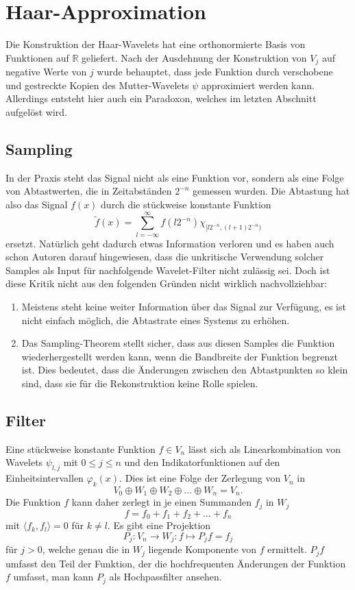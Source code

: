 %
%
%
\section{Haar-Approximation
\label{haar:approximation}}
Die Konstruktion der Haar-Wavelets hat eine orthonormierte Basis von
Funktionen auf $\mathbb R$ geliefert.
Nach der Ausdehnung der Konstruktion von $V_j$ auf negative Werte von $j$
wurde behauptet, dass jede Funktion durch verschobene und gestreckte 
Kopien des Mutter-Wavelets $\psi$ approximiert werden kann.
Allerdings entsteht hier auch ein Paradoxon, welches im letzten Abschnitt
aufgelöst wird.

\subsection{Sampling}
In der Praxis steht das Signal nicht als eine Funktion vor, sondern
als eine Folge von Abtastwerten, die in Zeitabständen $2^{-n}$ 
gemessen wurden.
Die Abtastung hat also das Signal $f(x)$ durch die stückweise
konstante Funktion
\[
\tilde{f}(x)
=
\sum_{l=-\infty}^\infty f(l2^{-n}) \chi_{[l2^{-n},(l+1)2^{-n})}
\]
ersetzt.
Natürlich geht dadurch etwas Information verloren und es haben auch
schon Autoren darauf hingewiesen, dass die unkritische Verwendung solcher
Samples als Input für nachfolgende Wavelet-Filter nicht zulässig sei.
Doch ist diese Kritik nicht aus den folgenden Gründen nicht wirklich
nachvollziehbar:
\begin{enumerate}
\item
Meistens steht keine weiter Information über das Signal zur Verfügung,
es ist nicht einfach möglich, die Abtastrate eines Systems zu erhöhen.
\item
Das Sampling-Theorem stellt sicher, dass aus diesen Samples die Funktion
wiederhergestellt werden kann, wenn die Bandbreite der Funktion 
begrenzt ist.
Dies bedeutet, dass die Änderungen zwischen den Abtastpunkten so klein
sind, dass sie für die Rekonstruktion keine Rolle spielen.
\end{enumerate}

\subsection{Filter}\label{haar:approximation:filter}
Eine stückweise konstante Funktion $f\in V_n$ lässt sich als Linearkombination
von Wavelets $\psi_{l,j}$ mit $0\le j \le n$ und den Indikatorfunktionen
auf den Einheitsintervallen $\varphi_k(x)$. 
Dies ist eine Folge der Zerlegung von $V_n$ in
\begin{equation}
V_0 \oplus W_1 \oplus W_2 \oplus \dots \oplus W_n = V_n.
\label{haar:filtersumme}
\end{equation}
Die Funktion $f$ kann daher zerlegt in je einen Summanden $f_j$ in $W_j$
\[
f = f_0 + f_1 + f_2 + \dots + f_n
\]
mit $\langle f_k,f_l\rangle = 0$ für $k\ne l$.
Es gibt eine Projektion
\[
P_j \colon V_n \to W_j : f \mapsto P_jf = f_j
\]
für $j>0$, welche genau die in $W_j$ liegende Komponente von $f$ 
ermittelt.
$P_jf$ umfasst den Teil der Funktion, der die hochfrequenten Änderungen
der Funktion $f$ umfasst, man kann $P_j$ als Hochpassfilter ansehen.

